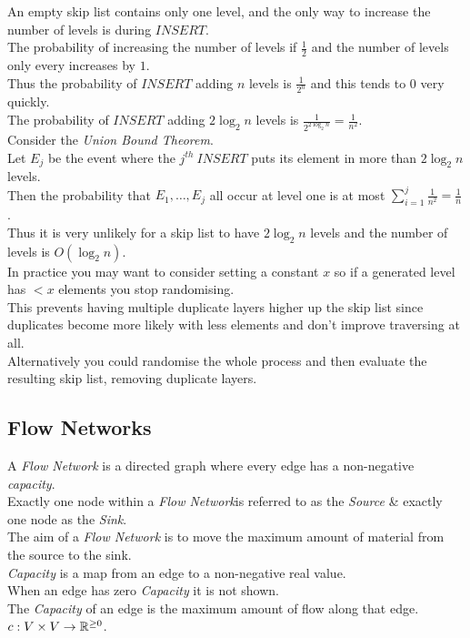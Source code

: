 \documentclass[11pt,a4paper]{article}
\begin{document}
An empty skip list contains only one level, and the only way to increase the number of levels is during $INSERT$.\\
The probability of increasing the number of levels if $\frac{1}{2}$ and the number of levels only every increases by $1$.\\
Thus the probability of $INSERT$ adding $n$ levels is $\frac{1}{2^n}$ and this tends to $0$ very quickly.\\
The probability of $INSERT$ adding $2\log_2n$ levels is $\frac{1}{2^{2\log_2n}}=\frac{1}{n^2}$.\\
Consider the \textit{Union Bound Theorem}.\\
Let $E_j$ be the event where the $j^{th}\ INSERT$ puts its element in more than $2\log_2n$ levels.\\
Then the probability that $E_1,\dots,E_j$ all occur at level one is at most $\sum_{i=1}^j\frac{1}{n^2}=\frac{1}{n}$.\\
Thus it is very unlikely for a skip list to have $2\log_2n$ levels and the number of levels is $O(\log_2n)$.\\

In practice you may want to consider setting a constant $x$ so if a generated level has $<x$ elements you stop randomising.\\
This prevents having multiple duplicate layers higher up the skip list since duplicates become more likely with less elements and don't improve traversing at all.\\
Alternatively you could randomise the whole process and then evaluate the resulting skip list, removing duplicate layers.

\subsection{Flow Networks}

A \textit{Flow Network} is a directed graph where every edge has a non-negative \textit{capacity}.\\ Exactly one node within a \textit{Flow Network}is referred to as the \textit{Source} \& exactly one node as the \textit{Sink}.\\
The aim of a \textit{Flow Network} is to move the maximum amount of material from the source to the sink.\\

\textit{Capacity} is a map from an edge to a non-negative real value.\\
When an edge has zero \textit{Capacity} it is not shown.\\
The \textit{Capacity} of an edge is the maximum amount of flow along that edge.\\
\nb $c:V\times V\to\mathbb{R}^{\geq0}$.\\
\end{document}

